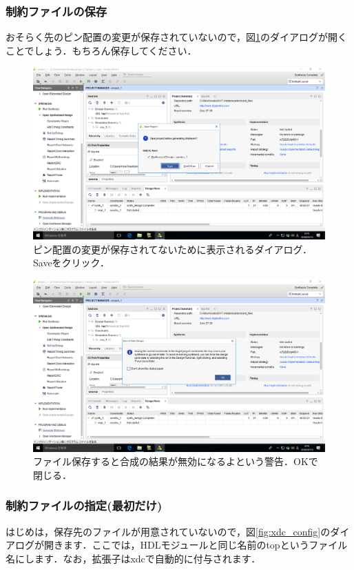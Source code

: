 \documentclass[a4paper,dvipdfmx]{jsarticle}
\begin{document}
\subsubsection{制約ファイルの保存}
おそらく先のピン配置の変更が保存されていないので，図\ref{fig:file_save_dialog}のダイアログが開くことでしょう．もちろん保存してください．

 \begin{figure}[H]
  \begin{center}
   \includegraphics[width=.8\textwidth]{chapter03_figures/VirtualBox_Windows10_19_03_2018_00_15_59.png}
  \end{center}
  \caption{ピン配置の変更が保存されてないために表示されるダイアログ．Saveをクリック． \label{fig:file_save_dialog}}
 \end{figure}

 \begin{figure}[H]
  \begin{center}
   \includegraphics[width=.8\textwidth]{chapter03_figures/VirtualBox_Windows10_19_03_2018_00_16_26.png}
  \end{center}
  \caption{ファイル保存すると合成の結果が無効になるよという警告．OKで閉じる．}
 \end{figure}

\subsubsection{制約ファイルの指定(最初だけ)}
はじめは，保存先のファイルが用意されていないので，図\ref{fig:xdc_config}のダイアログが開きます．ここでは，HDLモジュールと同じ名前のtopというファイル名にします．なお，拡張子はxdcで自動的に付与されます．
\end{document}
